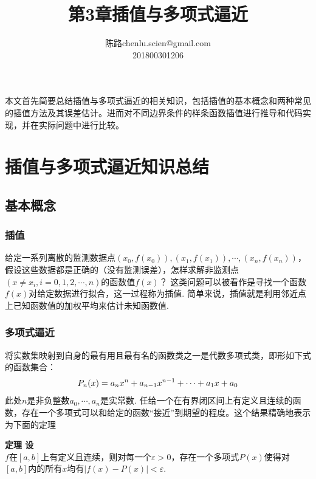 \documentclass[UTF8]{ctexart}
\makeatletter
\newenvironment{dingli}[2][定理]
{\begin{mdframed}[backgroundcolor=gray!20] \textbf{#1 #2} \\}
	{\end{mdframed}}
\newcommand\assignmentNumber{3}
\newcommand\studentName{陈路}
\newcommand\studentEmail{chenlu.scien@gmail.com}
\newcommand\studentNumber{201800301206}
\makeatother
\begin{document}
    
    \title{第\assignmentNumber 章\quad 插值与多项式逼近}
    
    \author{\name \studentName \email \studentEmail \\
    \studentNumber
    }
    
    \maketitle
本文首先简要总结插值与多项式逼近的相关知识，包括插值的基本概念和两种常见的插值方法及其误差估计。进而对不同边界条件的样条函数插值进行推导和代码实现，并在实际问题中进行比较。

\section{插值与多项式逼近知识总结}
\subsection{基本概念}
\subsubsection{插值}
给定一系列离散的监测数据点$\left(x_{0}, f\left(x_{0}\right)\right),\left(x_{1}, f\left(x_{1}\right)\right), \cdots,\left(x_{n}, f\left(x_{n}\right)\right)$，假设这些数据都是正确的（没有监测误差），怎样求解非监测点$\left(x \neq x_{i}, i=0,1,2, \cdots, n\right)$的函数值$f(x)$？
这类问题可以被看作是寻找一个函数$f(x)$对给定数据进行拟合，这一过程称为插值.
简单来说，插值就是利用邻近点上已知函数值的加权平均来估计未知函数值.

\subsubsection{多项式逼近}
将实数集映射到自身的最有用且最有名的函数类之一是代数多项式类，即形如下式的函数集合：
\begin{align}
	P_{n}(x)=a_{n} x^{n}+a_{n-1} x^{n-1}+\cdots+a_{1} x+a_{0}\notag
\end{align}
此处$n$是非负整数$a_{0},\cdots,a_{n}$是实常数.
任给一个在有界闭区间上有定义且连续的函数，存在一个多项式可以和给定的函数“接近”到期望的程度。这个结果精确地表示为下面的定理
\begin{dingli}{1}
	设$f$在$[a,b]$上有定义且连续，则对每一个$\varepsilon>0$，存在一个多项式$P(x)$使得对$[a,b]$内的所有$x$均有$|f(x)-P(x)|<\varepsilon$.
\end{dingli}
\end{document}
